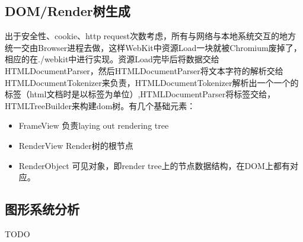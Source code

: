 \subsection{DOM/Render树生成}
出于安全性、cookie、http request次数考虑，所有与网络与本地系统交互的地方统一交由Browser进程去做，这样WebKit中资源Load一块就被Chromium废掉了，相应的在./webkit中进行实现。资源Load完毕后将数据交给HTMLDocumentParser，然后HTMLDocumentParser将文本字符的解析交给HTMLDocumentTokenizer来负责，HTMLDocumentTokenizer解析出一个一个的标签（html文档时是以标签为单位）,HTMLDocumentParser将标签交给，HTMLTreeBuilder来构建dom树。有几个基础元素：
\begin{itemize}
	\item FrameView 负责laying out rendering tree
	\item RenderView Render树的根节点
	\item RenderObject 可见对象，即render tree上的节点数据结构，在DOM上都有对应。
\end{itemize}

\subsection{图形系统分析}
TODO

